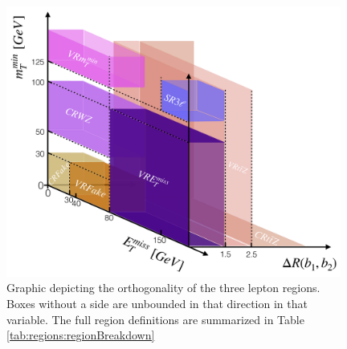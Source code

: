\begin{figure}[tbp]
  \begin{center}
    \includegraphics[width=0.98\textwidth]{figs/rpvthreel/3lregions.png}
  \end{center}
  \caption[Graphic depicting the orthogonality of the three lepton regions.]
          {Graphic depicting the orthogonality of the three lepton regions.
          Boxes without a side are unbounded in that direction in that variable.
          The full region definitions are summarized in Table \ref{tab:regions:regionBreakdown}}
   \label{fig:3lorthogonality}
\end{figure}
